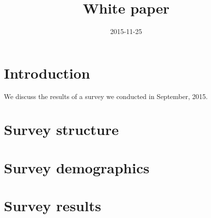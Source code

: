 \documentclass{casicswhitepaper}
\begin{document}
\title{White paper}
\date{2015-11-25}
\maketitle

\section{Introduction}

We discuss the results of a survey we conducted in September, 2015. 


\section{Survey structure}

\section{Survey demographics}

\section{Survey results}
\end{document}
